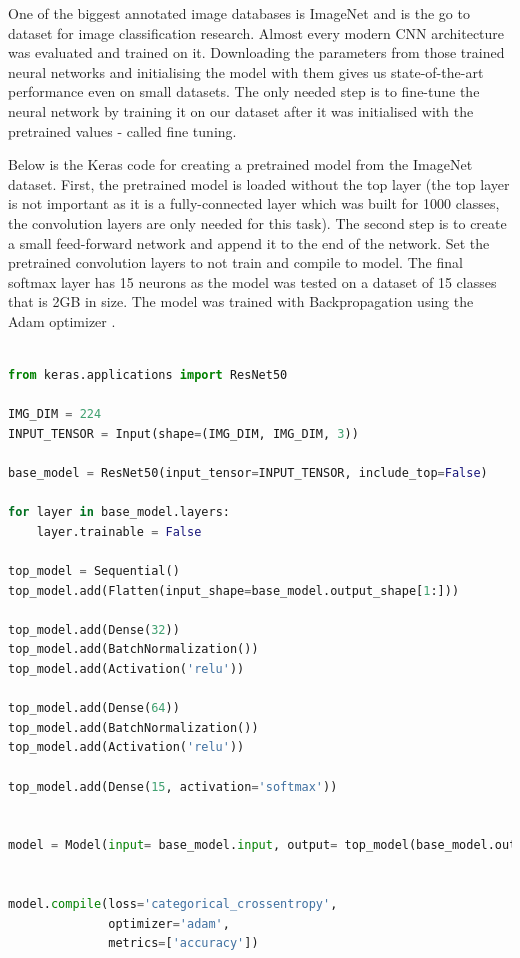 \documentclass[times, utf8, diplomski]{fer}
\begin{document}
One of the biggest annotated image databases is ImageNet \citep{imagenet} and is the go to dataset for image classification research. Almost every modern CNN architecture was evaluated and trained on it. Downloading the parameters from those trained neural networks and initialising the model with them gives us state-of-the-art performance even on small datasets. The only needed step is to fine-tune the neural network by training it on our dataset after it was initialised with the pretrained values - called fine tuning.

Below is the Keras code for creating a pretrained model from the ImageNet dataset. First, the pretrained model is loaded without the top layer (the top layer is not important as it is a fully-connected layer which was built for 1000 classes, the convolution layers are only needed for this task). The second step is to create a small feed-forward network and append it to the end of the network. Set the pretrained convolution layers to not train and compile to model. The final softmax layer has 15 neurons as the model was tested on a dataset of 15 classes that is 2GB in size. The model was trained with Backpropagation using the Adam optimizer \citep{kingma_adam:_2014}.

\begin{lstlisting}[language=Python, caption=Creating a custom pretrained ResNet using the weights from the ImageNet dataset]

from keras.applications import ResNet50

IMG_DIM = 224
INPUT_TENSOR = Input(shape=(IMG_DIM, IMG_DIM, 3))

base_model = ResNet50(input_tensor=INPUT_TENSOR, include_top=False)

for layer in base_model.layers:
    layer.trainable = False

top_model = Sequential()
top_model.add(Flatten(input_shape=base_model.output_shape[1:]))

top_model.add(Dense(32))
top_model.add(BatchNormalization())
top_model.add(Activation('relu'))

top_model.add(Dense(64))
top_model.add(BatchNormalization())
top_model.add(Activation('relu'))

top_model.add(Dense(15, activation='softmax'))


model = Model(input= base_model.input, output= top_model(base_model.output))

    
model.compile(loss='categorical_crossentropy',
              optimizer='adam',
              metrics=['accuracy'])
\end{lstlisting}
\end{document}
